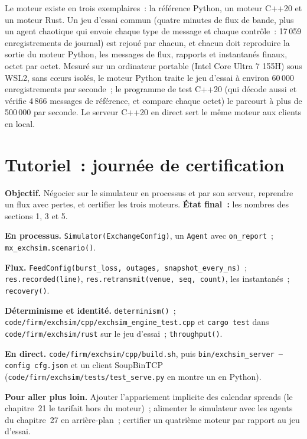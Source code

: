 Le moteur existe en trois exemplaires~: la référence Python, un moteur C++20 et un moteur Rust. Un jeu d'essai commun (quatre minutes de flux de bande, plus un agent chaotique
qui envoie chaque type de message et chaque contrôle~: 17\,059 enregistrements de journal) est rejoué par chacun, et chacun doit reproduire la sortie du moteur Python, les messages de flux,
rapports et instantanés finaux, octet par octet. Mesuré sur un ordinateur portable (Intel Core Ultra 7 155H) sous WSL2, sans cœurs isolés, le moteur Python
traite le jeu d'essai à environ 60\,000 enregistrements par seconde~; le programme de test C++20 (qui décode aussi et vérifie 4\,866 messages de référence, et compare chaque octet)
le parcourt à plus de 500\,000 par seconde. Le serveur C++20 en direct sert le même moteur aux clients en local.

\section{Tutoriel~: journée de certification}\label{tut:mx:build-a-matching-engine-and-exchange-simulator:tut}

\begin{tutorial}
\textbf{Objectif.} Négocier sur le simulateur en processus et par son serveur, reprendre un flux avec pertes, et certifier les trois moteurs.
\textbf{État final~:} les nombres des sections 1, 3 et 5.
\begin{tutsteps}
\item \textbf{En processus.} \texttt{Simulator(ExchangeConfig)}, un \texttt{Agent} avec \texttt{on\_report}~; \texttt{mx\_exchsim.scenario()}.
\item \textbf{Flux.} \texttt{FeedConfig(burst\_loss, outages, snapshot\_every\_ns)}~; \texttt{res.recorded(line)}, \texttt{res.retransmit(venue, seq, count)},
les instantanés~; \texttt{recovery()}.
\item \textbf{Déterminisme et identité.} \texttt{determinism()}~; \texttt{code/firm/exchsim/cpp/exchsim\_engine\_test.cpp} et \texttt{cargo test} dans
\texttt{code/firm/exchsim/rust} sur le jeu d'essai~; \texttt{throughput()}.
\item \textbf{En direct.} \texttt{code/firm/exchsim/cpp/build.sh}, puis \texttt{bin/exchsim\_server --config cfg.json} et un client SoupBinTCP
(\texttt{code/firm/exchsim/tests/test\_serve.py} en montre un en Python).
\end{tutsteps}
\textbf{Pour aller plus loin.} Ajouter l'appariement implicite des calendar spreads (le chapitre~21 le tarifait hors du moteur)~; alimenter le simulateur avec les agents du chapitre~27
en arrière-plan~; certifier un quatrième moteur par rapport au jeu d'essai.
\end{tutorial}

